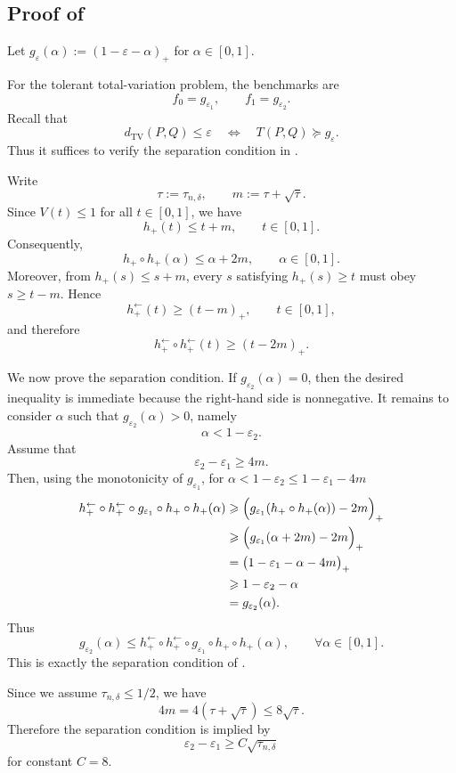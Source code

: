 \documentclass[english]{article}
\theoremstyle{plain}
\theoremstyle{definition}
\newcommand{\hinv}{h_+^{\leftarrow}}
\newcommand{\Toff}[2]{T(#1,#2)}
\newcommand{\fnull}{f_0}
\newcommand{\falt}{f_1}
\newcommand{\hup}{h_+}                             %
\newcommand{\dTV}{d_{\mathrm{TV}}}                 %
\begin{document}
\subsection{Proof of }
\label{sec:proof-tvtolerant-vc}
Let \(g_\varepsilon(\alpha):=(1-\varepsilon-\alpha)_+\) for \(\alpha\in[0,1].\)

\noindent For the tolerant total-variation problem, the benchmarks are
\[
\fnull=g_{\varepsilon_1},
\qquad
\falt=g_{\varepsilon_2}.
\]
Recall that
\[
\dTV(P,Q)\leqslant \varepsilon
\quad\Longleftrightarrow\quad
\Toff{P}{Q}\succeq g_\varepsilon .
\]
Thus it suffices to verify the separation condition in
.

\noindent Write
\[
\tau:=\tau_{n,\delta},
\qquad
m:=\tau+\sqrt{\tau}.
\]
Since \(V(t)\leqslant 1\) for all \(t\in[0,1]\), we have
\[
\hup(t)\leqslant t+m,
\qquad t\in[0,1].
\]
Consequently,
\[
\hup\circ\hup(\alpha)\leqslant \alpha+2m,
\qquad \alpha\in[0,1].
\]
Moreover, from \(\hup(s)\leqslant s+m\), every \(s\) satisfying
\(\hup(s)\geqslant t\) must obey \(s\geqslant t-m\). Hence
\[
\hinv(t)\geqslant (t-m)_+,
\qquad t\in[0,1],
\]
and therefore
\[
\hinv\circ\hinv(t)\geqslant (t-2m)_+.
\]

We now prove the separation condition. If
\(g_{\varepsilon_2}(\alpha)=0\), then the desired inequality is immediate
because the right-hand side is nonnegative. It remains to consider
\(\alpha\) such that \(g_{\varepsilon_2}(\alpha)>0\), namely
\[
\alpha<1-\varepsilon_2.
\]
Assume that
\[
\varepsilon_2-\varepsilon_1\geqslant 4m.
\]
Then, using the monotonicity of \(g_{\varepsilon_1}\), for \(\alpha<1-\varepsilon_2\leqslant 1-\varepsilon_1-4m\)
\begin{align*}
\hinv\circ\hinv\circ g_{\varepsilon_1}
\circ\hup\circ\hup(\alpha)
&\geqslant
\Bigl(g_{\varepsilon_1}(\hup\circ\hup(\alpha))-2m\Bigr)_+ \\
&\geqslant
\Bigl(g_{\varepsilon_1}(\alpha+2m)-2m\Bigr)_+ \\
&=
\bigl(1-\varepsilon_1-\alpha-4m\bigr)_+ \\
&\geqslant 1-\varepsilon_2-\alpha\\
&=g_{\varepsilon_2}(\alpha).
\end{align*}
Thus
\[
g_{\varepsilon_2}(\alpha)
\leqslant
\hinv\circ\hinv\circ g_{\varepsilon_1}
\circ\hup\circ\hup(\alpha),
\qquad \forall \alpha\in[0,1].
\]
This is exactly the separation condition of .

\noindent Since we assume \(\tau_{n,\delta}\leqslant 1/2\), we have
\[
4m=4(\tau+\sqrt{\tau})\leqslant 8\sqrt{\tau}.
\]
Therefore the separation condition is implied by
\[
\varepsilon_2-\varepsilon_1
\geqslant C\sqrt{\tau_{n,\delta}}
\]
for constant \(C=8\).
\end{document}
